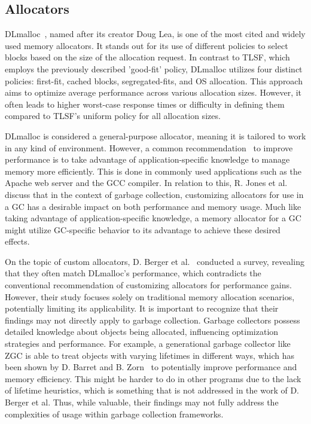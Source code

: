 

\subsection{Allocators}

DLmalloc~\cite{dlmalloc}, named after its creator Doug Lea, is one of the most cited and widely used memory allocators. It stands out for its use of different policies to select blocks based on the size of the allocation request. In contrast to TLSF, which employs the previously described 'good-fit' policy, DLmalloc utilizes four distinct policies: first-fit, cached blocks, segregated-fits, and OS allocation. This approach aims to optimize average performance across various allocation sizes. However, it often leads to higher worst-case response times or difficulty in defining them compared to TLSF's uniform policy for all allocation sizes.

DLmalloc is considered a general-purpose allocator, meaning it is tailored to work in any kind of environment. However, a common recommendation~\cite{custom_rec_1, custom_rec_2} to improve performance is to take advantage of application-specific knowledge to manage memory more efficiently. This is done in commonly used applications such as the Apache web server and the GCC compiler. In relation to this, R. Jones et al.~\cite{gchandbook} discuss that in the context of garbage collection, customizing allocators for use in a GC has a desirable impact on both performance and memory usage. Much like taking advantage of application-specific knowledge, a memory allocator for a GC might utilize GC-specific behavior to its advantage to achieve these desired effects.

On the topic of custom allocators, D. Berger et al.~\cite{slow_custom_allocators} conducted a survey, revealing that they often match DLmalloc's performance, which contradicts the conventional recommendation of customizing allocators for performance gains. However, their study focuses solely on traditional memory allocation scenarios, potentially limiting its applicability. It is important to recognize that their findings may not directly apply to garbage collection. Garbage collectors possess detailed knowledge about objects being allocated, influencing optimization strategies and performance. For example, a generational garbage collector like ZGC is able to treat objects with varying lifetimes in different ways, which has been shown by D. Barret and B. Zorn~\cite{lifetime_predictors_memalloc} to potentially improve performance and memory efficiency. This might be harder to do in other programs due to the lack of lifetime heuristics, which is something that is not addressed in the work of D. Berger et al. Thus, while valuable, their findings may not fully address the complexities of usage within garbage collection frameworks.

